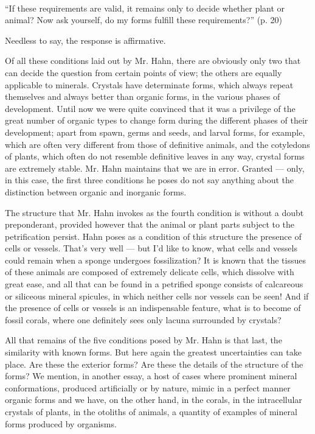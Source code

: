 \documentclass[a4paper, 12pt, oneside]{article}
\begin{document}
\paragraph*{}
``If these requirements are valid, it remains only to decide whether plant or animal? Now ask yourself, do my forms fulfill these requirements?'' (p. 20)

Needless to say, the response is affirmative.

Of all these conditions laid out by Mr. Hahn, there are obviously only two that can decide the question from certain points of view; the others are equally applicable to minerals. Crystals have determinate forms, which always repeat themselves and always better than organic forms, in the various phases of development. Until now we were quite convinced that it was a privilege of the great number of organic types to change form during the different phases of their development; apart from spawn, germs and seeds, and larval forms, for example, which are often very different from those of definitive animals, and the cotyledons of plants, which often do not resemble definitive leaves in any way, crystal forms are extremely stable. Mr. Hahn maintains that we are in error. Granted --- only, in this case, the first three conditions he poses do not say anything about the distinction between organic and inorganic forms.

The structure that Mr. Hahn invokes as the fourth condition is without a doubt preponderant, provided however that the animal or plant parts subject to the petrification persist. Hahn poses as a condition of this structure the presence of cells or vessels. That's very well --- but I'd like to know, what cells and vessels could remain when a sponge undergoes fossilization? It is known that the tissues of these animals are composed of extremely delicate cells, which dissolve with great ease, and all that can be found in a petrified sponge consists of calcareous or siliceous mineral spicules, in which neither cells nor vessels can be seen! And if the presence of cells or vessels is an indispensable feature, what is to become of fossil corals, where one definitely sees only lacuna surrounded by crystals?

All that remains of the five conditions posed by Mr. Hahn is that last, the similarity with known forms. But here again the greatest uncertainties can take place. Are these the exterior forms? Are these the details of the structure of the forms? We mention, in another essay, a host of cases where prominent mineral conformations, produced artificially or by nature, mimic in a perfect manner organic forms and we have, on the other hand, in the corals, in the intracellular crystals of plants, in the otoliths of animals, a quantity of examples of mineral forms produced by organisms.
\end{document}

